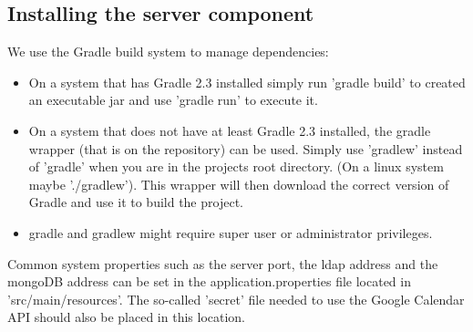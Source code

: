\subsection{Installing the server component}   
We use the Gradle build system to manage dependencies:
	\begin{itemize}
	
		\item On a system that has Gradle 2.3 installed simply run 'gradle build'  to created an executable jar and use 'gradle run' to execute it.
		\item On a system that does not have at least Gradle 2.3 installed, the gradle wrapper (that is on the repository) can be used. Simply use 'gradlew' instead of 'gradle' when you are in the projects root directory. (On a linux system maybe './gradlew'). This wrapper will then download the correct version of Gradle and use it to build the project.
		\item gradle and gradlew might require super user or administrator privileges.
	
	\end{itemize}
	
	Common system properties such as the server port, the ldap address and the mongoDB address can be set in the application.properties file located in 'src/main/resources'. The so-called 'secret' file needed to use the Google Calendar API should also be placed in this location.